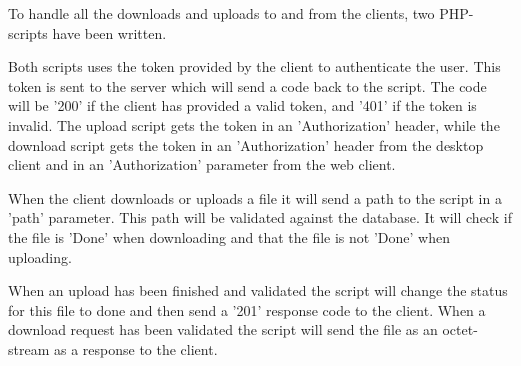 To handle all the downloads and uploads to and from the clients, two PHP-scripts have been written. 

Both scripts uses the token provided by the client to authenticate the user. This token is sent to the server which will send a code back to the script. The code will be '200' if the client has provided a valid token, and '401' if the token is invalid. The upload script gets the token in an 'Authorization' header, while the download script gets the token in an 'Authorization' header from the desktop client and in an 'Authorization' parameter from the web client.

When the client downloads or uploads a file it will send a path to the script in a 'path' parameter. This path will be validated against the database. It will check if the file is 'Done' when downloading and that the file is not 'Done' when uploading.

When an upload has been finished and validated the script will change the status for this file to done and then send a '201' response code to the client. When a download request has been validated the script will send the file as an octet-stream as a response to the client.